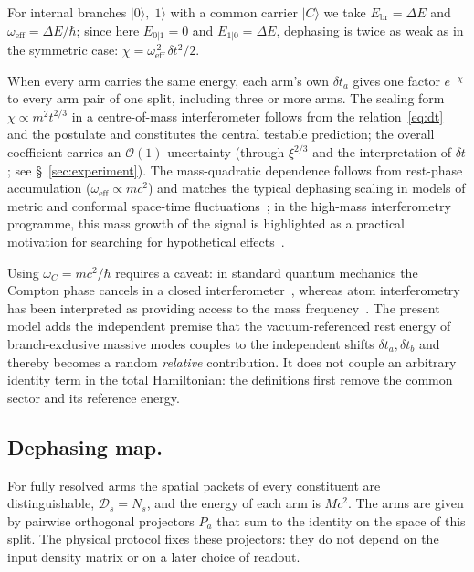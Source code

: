 \documentclass[11pt,a4paper]{article}
\begin{document}
For internal branches $|0\rangle,|1\rangle$ with a common carrier $|C\rangle$ we take $E_{\mathrm{br}}=\Delta E$ and $\omega_{\mathrm{eff}}=\Delta E/\hbar$; since here $E_{0|1}=0$ and $E_{1|0}=\Delta E$, dephasing is twice as weak as in the symmetric case: $\chi=\omega_{\mathrm{eff}}^{\,2}\,\delta t^2/2$.

When every arm carries the same energy, each arm's own $\delta t_a$ gives one factor $e^{-\chi}$ to every arm pair of one split, including three or more arms. The scaling form $\chi\propto m^2 t^{2/3}$ in a centre-of-mass interferometer follows from the relation~\eqref{eq:dt} and the postulate and constitutes the central testable prediction; the overall coefficient carries an $\mathcal O(1)$ uncertainty (through $\xi^{2/3}$ and the interpretation of $\delta t$; see \S~\ref{sec:experiment}). The mass-quadratic dependence follows from rest-phase accumulation ($\omega_{\mathrm{eff}}\propto mc^2$) and matches the typical dephasing scaling in models of metric and conformal space-time fluctuations~\cite{bonifacio2009,breuer2009}; in the high-mass interferometry programme, this mass growth of the signal is highlighted as a practical motivation for searching for hypothetical effects~\cite{kialka2022}.

Using $\omega_C=mc^2/\hbar$ requires a caveat: in standard quantum mechanics the Compton phase cancels in a closed interferometer~\cite{wolf2011compton}, whereas atom interferometry has been interpreted as providing access to the mass frequency~\cite{lan2013clock}. The present model adds the independent premise that the vacuum-referenced rest energy of branch-exclusive massive modes couples to the independent shifts $\delta t_a,\delta t_b$ and thereby becomes a random \emph{relative} contribution. It does not couple an arbitrary identity term in the total Hamiltonian: the definitions first remove the common sector and its reference energy.

\subsection{Dephasing map.}
\label{sec:map}
For fully resolved arms the spatial packets of every constituent are distinguishable, $\mathcal D_s=N_s$, and the energy of each arm is $Mc^2$. The arms are given by pairwise orthogonal projectors $P_a$ that sum to the identity on the space of this split. The physical protocol fixes these projectors: they do not depend on the input density matrix or on a later choice of readout.
\end{document}
